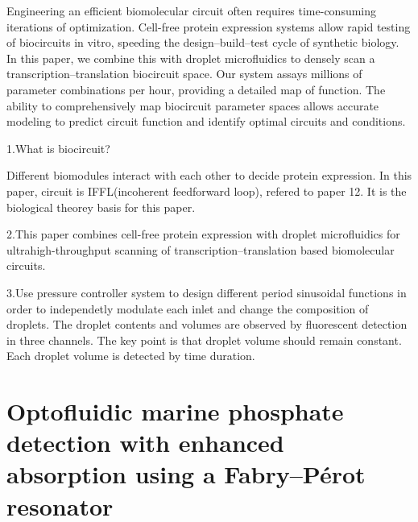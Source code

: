 \documentclass{article}
\begin{document}
Engineering an efficient biomolecular circuit often requires time-consuming iterations of optimization. Cell-free protein expression systems allow rapid testing of biocircuits in vitro, speeding the design–build–test cycle of synthetic biology. In this paper, we combine this with droplet microfluidics to densely scan a transcription–translation biocircuit space. Our system assays millions of parameter combinations per hour, providing a detailed map of function. The ability to comprehensively map biocircuit parameter spaces allows accurate modeling to predict circuit function and identify optimal circuits and conditions. 


1.What is biocircuit? 

Different biomodules interact with each other to decide protein expression.
In this paper, circuit is IFFL(incoherent feedforward loop), refered to paper 12. It is the biological theorey basis for this paper. 


2.This paper combines cell-free protein expression with droplet microfluidics for ultrahigh-throughput scanning of transcription–translation based biomolecular circuits.


3.Use pressure controller system  to design different period sinusoidal functions in order to independetly modulate each inlet and change the composition of droplets. The droplet contents and volumes are observed by  fluorescent detection in three channels.
The key point is that droplet volume should remain constant. 
Each droplet volume is detected by time duration.


\part{Optofluidic marine phosphate detection with enhanced absorption using a Fabry–Pérot resonator}
\end{document}
